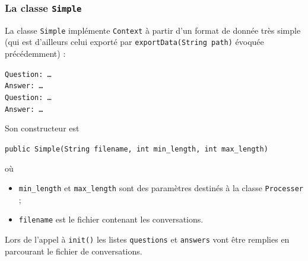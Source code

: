 \documentclass[10pt,a4paper]{article}
\newcommand\tab[1][0.5cm]{\hspace*{#1}}
\begin{document}
\subsubsection{La classe \texttt{Simple}}
La classe \texttt{Simple} implémente \texttt{Context} à partir d'un format de donnée très simple (qui est d'ailleurs celui exporté par \texttt{exportData(String path)} évoquée précédemment) :
\begin{center}
	\texttt{Question: \ldots} \\
	\texttt{Answer: \ldots} \\
	\texttt{Question: \ldots} \\
	\texttt{Answer: \ldots} \\
\end{center}
Son constructeur est
\begin{center}
	\texttt{public Simple(String filename, int min\_length, int max\_length)}
\end{center}
où
\begin{itemize}
	\item \texttt{min\_length} et \texttt{max\_length} sont des paramètres destinés à la classe \texttt{Processer} ;
	\item \texttt{filename} est le fichier contenant les conversations.
\end{itemize}
\tab  Lors de l'appel à \texttt{init()} les listes \texttt{questions} et \texttt{answers} vont être remplies en parcourant le fichier de conversations.
\end{document}
